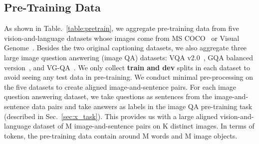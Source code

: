 \documentclass[11pt,a4paper]{article}
\begin{document}
\subsection{Pre-Training Data}
\label{sec:pretrain_data}
As shown in Table.~\ref{table:pretrain}, we aggregate pre-training data from five vision-and-language datasets whose images come from MS COCO~\cite{lin2014microsoft} or Visual Genome~\cite{krishna2017visual}. 
Besides the two original captioning datasets, we also aggregate three large image question answering (image QA) datasets: VQA v2.0~\cite{antol2015vqa}, GQA balanced version~\cite{hudson2019gqa}, and VG-QA~\cite{zhu2016visual7w}.
We only collect \textbf{train and dev} splits in each dataset to avoid seeing any test data in pre-training.
We conduct minimal pre-processing on the five datasets to create aligned image-and-sentence pairs.
For each image question answering dataset, we take questions as sentences from the image-and-sentence data pairs and take answers as labels in the image QA pre-training task (described in Sec.~\ref{sec:x_task}).
This provides us with a large aligned vision-and-language dataset of M image-and-sentence pairs on K distinct images.
In terms of tokens, the pre-training data contain around M words and M image objects.
\end{document}
